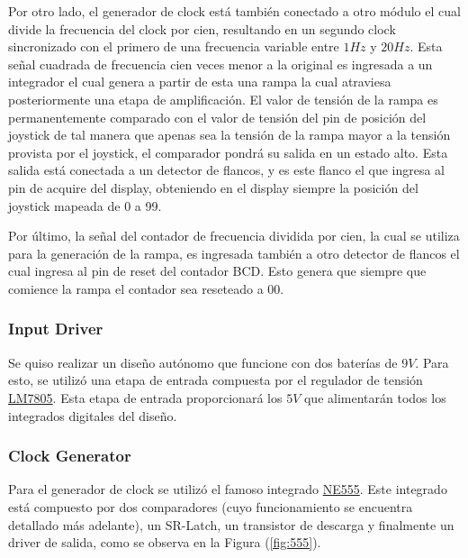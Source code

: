 Por otro lado, el generador de clock está también conectado a otro módulo el cual divide la frecuencia del clock por cien, resultando en un segundo clock sincronizado con el primero de una frecuencia variable entre $1Hz$ y $20Hz$. Esta señal cuadrada de frecuencia cien veces menor a la original es ingresada a un integrador el cual genera a partir de esta una rampa la cual atraviesa posteriormente una etapa de amplificación. El valor de tensión de la rampa es permanentemente comparado con el valor de tensión del pin de posición del joystick de tal manera que apenas sea la tensión de la rampa mayor a la tensión provista por el joystick, el comparador pondrá su salida en un estado alto. Esta salida está conectada a un detector de flancos, y es este flanco el que ingresa al pin de acquire del display, obteniendo en el display siempre la posición del joystick mapeada de 0 a 99.

Por último, la señal del contador de frecuencia dividida por cien, la cual se utiliza para la generación de la rampa, es ingresada también a otro detector de flancos el cual ingresa al pin de reset del contador BCD. Esto genera que siempre que comience la rampa el contador sea reseteado a 00.

\subsubsection{Input Driver}

Se quiso realizar un diseño autónomo que funcione con dos baterías de $9V$. Para esto, se utilizó una etapa de entrada compuesta por el regulador de tensión \href{https://www.sparkfun.com/datasheets/Components/LM7805.pdf}{LM7805}. Esta etapa de entrada proporcionará los $5V$ que alimentarán todos los integrados digitales del diseño.

\subsubsection{Clock Generator}

Para el generador de clock se utilizó el famoso integrado \href{http://www.ti.com/lit/ds/symlink/se555.pdf}{NE555}. Este integrado está compuesto por dos comparadores (cuyo funcionamiento se encuentra detallado más adelante), un SR-Latch, un transistor de descarga y finalmente un driver de salida, como se observa en la Figura (\ref{fig:555}).

